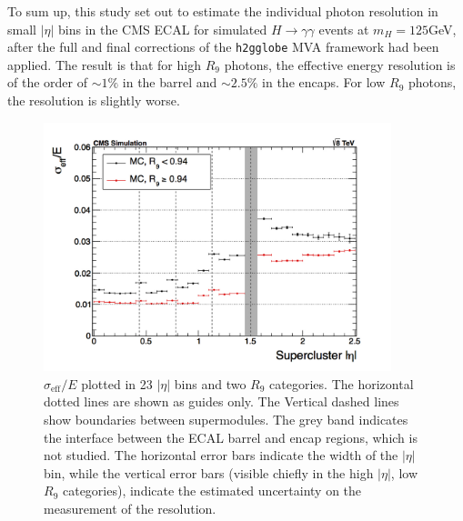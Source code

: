 \documentclass[10pt]{article}
\begin{document}
To sum up, this study set out to estimate the individual photon resolution in small $|\eta|$ bins in the CMS ECAL for simulated $H \rightarrow \gamma \gamma$ events at $m_H =125$GeV, after the full and final corrections of the \texttt{h2gglobe} MVA framework had been applied. The result is that for high $R_9$ photons, the effective energy resolution is of the order of $\sim 1\%$ in the barrel and $\sim 2.5\%$ in the encaps. For low $R_9$ photons, the resolution is slightly worse.

\begin{figure}[h!]
\centering
\includegraphics[width=0.9\textwidth]{"EffSigma_vs_eta_mva"}
\caption{$\sigma_{\text{eff}}/E$ plotted in 23 $|\eta|$ bins and two $R_9$ categories. The horizontal dotted lines are shown as guides only. The Vertical dashed lines show boundaries between supermodules. The grey band indicates the interface between the ECAL barrel and encap regions, which is not studied. The horizontal error bars indicate the width of the $|\eta|$ bin, while the vertical error bars (visible chiefly in the high $|\eta|$, low $R_{9}$ categories), indicate the estimated uncertainty on the measurement of the resolution.}
\label{mainPlot}
\end{figure}
\end{document}
